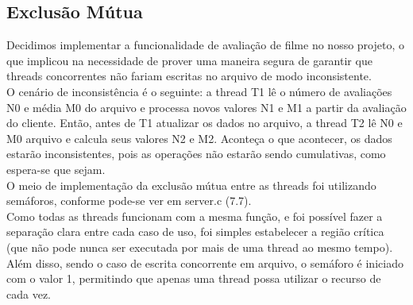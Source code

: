 \documentclass[11pt,twoside]{article}
\begin{document}
\subsection{Exclusão Mútua}
Decidimos implementar a funcionalidade de avaliação de filme no nosso projeto, o que implicou na necessidade de prover uma maneira segura de garantir que threads concorrentes não fariam escritas no arquivo de modo inconsistente.\\
O cenário de inconsistência é o seguinte: a thread T1 lê o número de avaliações N0 e média M0 do arquivo e processa novos valores N1 e M1 a partir da avaliação do cliente. Então, antes de T1 atualizar os dados no arquivo, a thread T2 lê N0 e M0 arquivo e calcula seus valores N2 e M2. Aconteça o que acontecer, os dados estarão inconsistentes, pois as operações não estarão sendo cumulativas, como espera-se que sejam.\\
O meio de implementação da exclusão mútua entre as threads foi utilizando semáforos, conforme pode-se ver em server.c (7.7).\\
Como todas as threads funcionam com a mesma função, e foi possível fazer a separação clara entre cada caso de uso, foi simples estabelecer a região crítica (que não pode nunca ser executada por mais de uma thread ao mesmo tempo).\\
Além disso, sendo o caso de escrita concorrente em arquivo, o semáforo é iniciado com o valor 1, permitindo que apenas uma thread possa utilizar o recurso de cada vez.
\end{document}
